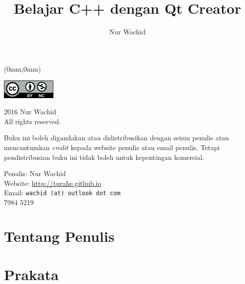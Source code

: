 \documentclass[11pt,b5paper,oneside,titlepage]{book}
\makeatletter
\renewcommand{\cleardoublepage}{
	\clearpage\ifodd\c@page\else
	\hbox{}
	\vspace*{\fill}
	\thispagestyle{empty}
	\newpage
	\fi}
\makeatother
\begin{document}
	\dominitoc 
	\begingroup  
	\thispagestyle{empty}
	\begin{textblock*}{297mm}(0mm,0mm)
	\end{textblock*}
	\endgroup
	\title{Belajar C++ dengan Qt Creator}
	\author{Nur Wachid}
	\cleardoublepage
	\frontmatter

	\begingroup
	\parskip \baselineskip
	\thispagestyle{empty}

\noindent \includegraphics[width=0.2\textwidth]{cc-by-nc}

\noindent \textcopyright{} 2016 Nur Wachid \\
	All rights reserved.
	
	Buku ini boleh digandakan atau didistribusikan dengan
	seizin penulis atau mencantumkan \emph{credit} kepada
	website penulis atau email penulis. Tetapi pendistribusian
	buku ini tidak boleh untuk kepentingan komersial.
	
\noindent Penulis: Nur Wachid \\
	Website: \url{http://turahe.github.io}  \\
	Email: \texttt{wachid  (at) outlook dot com} \\
	 7984 5219
	
	\chapter{Tentang Penulis}
	
	
	\endgroup
	\tableofcontents
	\cleardoublepage
{}
{}
	\lstlistoflistings

	\clearpage
	\newpage
	\chapter{Prakata}
	
	\newpage
	\cleardoublepage
	\mainmatter

\end{document}
